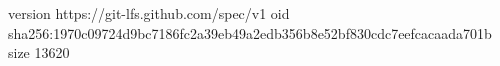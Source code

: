 version https://git-lfs.github.com/spec/v1
oid sha256:1970c09724d9bc7186fc2a39eb49a2edb356b8e52bf830cdc7eefcacaada701b
size 13620
